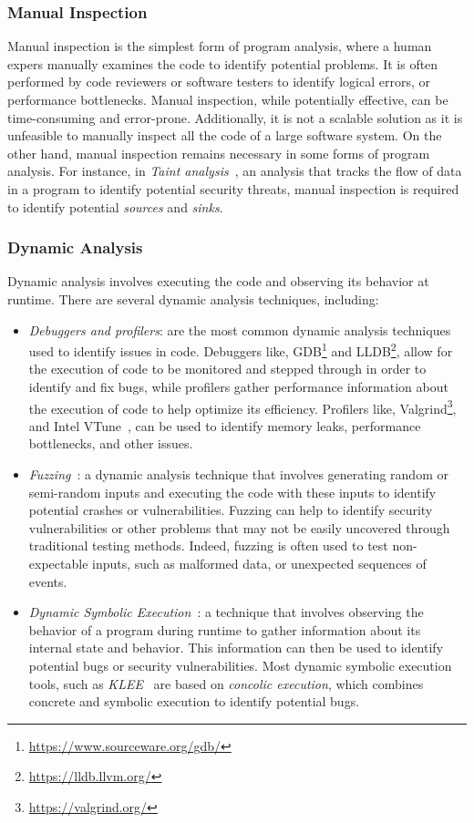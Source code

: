 \subsubsection{Manual Inspection}
Manual inspection is the simplest form of program analysis, where a human expers
manually examines the code to identify potential problems. It is often performed
by code reviewers or software testers to identify logical errors,
or performance bottlenecks. Manual inspection, while potentially effective, can
be time-consuming and error-prone. Additionally, it is not a scalable solution as it is unfeasible
to manually inspect all the code of a large software system.
On the other hand, manual inspection remains necessary in some forms of program analysis. For instance,
in \emph{Taint analysis}~\cite{arzt2014flowdroid}, an analysis that tracks the flow of data in a program
to identify potential security threats, manual inspection is required to identify
potential \emph{sources} and \emph{sinks}.

\subsubsection{Dynamic Analysis}
Dynamic analysis involves executing the code and observing its behavior at runtime.
There are several dynamic analysis techniques, including:
\begin{itemize}
  \item \emph{Debuggers and profilers}: are the most common dynamic analysis techniques used to identify issues in code.
  Debuggers like, GDB\footnote{\url{https://www.sourceware.org/gdb/}} and LLDB\footnote{\url{https://lldb.llvm.org/}}, allow for the execution of code to be
  monitored and stepped through in order to identify and fix bugs,
  while profilers gather performance information about the execution of code to help optimize its efficiency.
  Profilers like, Valgrind\footnote{\url{https://valgrind.org/}}, and Intel VTune~\cite{reinders2005vtune}, can be used to identify memory leaks,
  performance bottlenecks, and other issues.
  \item \emph{Fuzzing}~\cite{li2018fuzzing}: a dynamic analysis technique that involves generating random or
  semi-random inputs and executing the code with these inputs to identify potential
  crashes or vulnerabilities. Fuzzing can help to identify security vulnerabilities
  or other problems that may not be easily uncovered through traditional testing methods.
  Indeed, fuzzing is often used to test non-expectable inputs, such as malformed data,
  or unexpected sequences of events.
  \item \emph{Dynamic Symbolic Execution}~\cite{Baldoni2018Survey}: a technique that
  involves observing the behavior of a program during runtime to gather information
  about its internal state and behavior. This information can then be used to
  identify potential bugs or security vulnerabilities. Most dynamic symbolic execution tools,
  such as \emph{KLEE}~\cite{cadar2008klee} are based on \emph{concolic execution},
  which combines concrete and symbolic execution to identify potential bugs.
\end{itemize}


